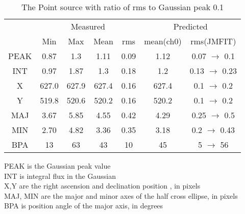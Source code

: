 \begin{table}
\caption{The Point source with ratio of rms to Gaussian peak  0.1}
\label{tab:1}
\begin{center}
\begin{tabular}{|c| c c c c|c c|} \hline
& \multicolumn{4}{c|}{Measured} &\multicolumn{2}{c|}{Predicted}\\ \cline{2-7}
       & Min& Max& Mean &rms & mean(ch0)& rms(JMFIT)\\
 \hline
PEAK  & 0.87    & 1.3   & 1.11  & 0.09 & 1.12  &0.07 $\rightarrow$ 0.1\\
INT   & 0.97    &1.87   & 1.3   & 0.18 & 1.2   &0.13 $\rightarrow$ 0.23\\
X     & 627.0   & 627.9 & 627.4 & 0.16 & 627.4 &0.1 $\rightarrow$ 0.2\\
Y     & 519.8   & 520.6 & 520.2 & 0.16 & 520.2 &0.1 $\rightarrow$ 0.2\\
MAJ   & 3.67    & 5.85  & 4.55  & 0.42 & 4.29  &0.25 $\rightarrow$ 0.5 \\
MIN   & 2.70    & 4.82  & 3.36  & 0.35 & 3.18  &0.2 $\rightarrow$ 0.43\\
BPA   & 13      &63     & 43    & 10   & 45    & 5 $\rightarrow$ 56\\
\hline
\end{tabular}
\end{center}
{\small
PEAK is the Gaussian peak value \\
INT is integral flux in the Gaussian \\
X,Y are the right ascension and declination position , in pixels \\
MAJ, MIN are the major and minor axes of the half cross ellipse, in pixels \\
BPA is position angle of the major axis, in degrees\\
}
\end{table}

